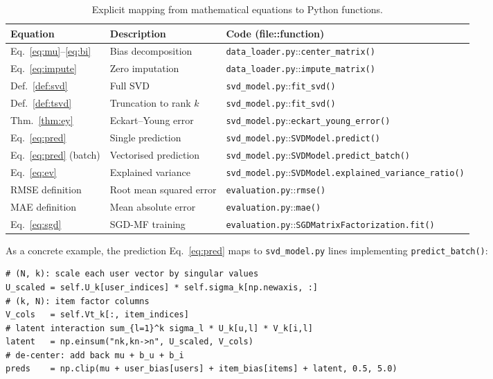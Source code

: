 \documentclass[12pt, a4paper]{article}
\newcommand{\file}[1]{\texttt{\small #1}}
\begin{document}
\begin{table}[h!]
\centering
\caption{Explicit mapping from mathematical equations to Python functions.}
\begin{tabular}{lll}
\toprule
\textbf{Equation} & \textbf{Description} & \textbf{Code (file::function)} \\
\midrule
Eq.~\eqref{eq:mu}--\eqref{eq:bi} & Bias decomposition &
    \file{data\_loader.py}::\texttt{center\_matrix()} \\
Eq.~\eqref{eq:impute}   & Zero imputation &
    \file{data\_loader.py}::\texttt{impute\_matrix()} \\
Def.~\ref{def:svd}        & Full SVD &
    \file{svd\_model.py}::\texttt{fit\_svd()} \\
Def.~\ref{def:tsvd}       & Truncation to rank $k$ &
    \file{svd\_model.py}::\texttt{fit\_svd()} \\
Thm.~\ref{thm:ey}         & Eckart--Young error &
    \file{svd\_model.py}::\texttt{eckart\_young\_error()} \\
Eq.~\eqref{eq:pred}       & Single prediction &
    \file{svd\_model.py}::\texttt{SVDModel.predict()} \\
Eq.~\eqref{eq:pred} (batch) & Vectorised prediction &
    \file{svd\_model.py}::\texttt{SVDModel.predict\_batch()} \\
Eq.~\eqref{eq:ev}         & Explained variance &
    \file{svd\_model.py}::\texttt{SVDModel.explained\_variance\_ratio()} \\
RMSE definition           & Root mean squared error &
    \file{evaluation.py}::\texttt{rmse()} \\
MAE definition            & Mean absolute error &
    \file{evaluation.py}::\texttt{mae()} \\
Eq.~\eqref{eq:sgd}        & SGD-MF training &
    \file{evaluation.py}::\texttt{SGDMatrixFactorization.fit()} \\
\bottomrule
\end{tabular}
\label{tab:impl_map}
\end{table}

As a concrete example, the prediction Eq.~\eqref{eq:pred} maps to
\file{svd\_model.py} lines implementing \texttt{predict\_batch()}:

\begin{lstlisting}[caption={Code implementation of Eq.~\eqref{eq:pred}}]
# (N, k): scale each user vector by singular values
U_scaled = self.U_k[user_indices] * self.sigma_k[np.newaxis, :]
# (k, N): item factor columns
V_cols   = self.Vt_k[:, item_indices]
# latent interaction sum_{l=1}^k sigma_l * U_k[u,l] * V_k[i,l]
latent   = np.einsum("nk,kn->n", U_scaled, V_cols)
# de-center: add back mu + b_u + b_i
preds    = np.clip(mu + user_bias[users] + item_bias[items] + latent, 0.5, 5.0)
\end{lstlisting}
\end{document}
